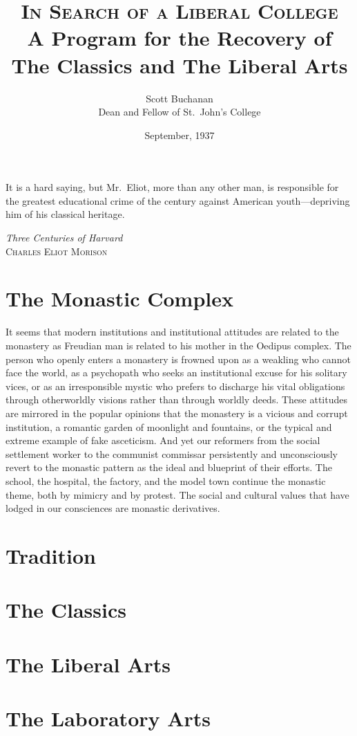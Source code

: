 \documentclass{memoir}
\title{\textsc{In Search of a Liberal College}\\ A Program for the Recovery of The Classics and The Liberal Arts}
\author{Scott Buchanan\\ Dean and Fellow of St.\ John's College}
\date{September, 1937}
\begin{document}
\maketitle

\epigraph{It is a hard saying, but Mr.\ Eliot, more than any other man,
is responsible for the greatest educational crime of the century against
American youth---depriving him of his classical heritage.}{\emph{Three
Centuries of Harvard}\\ \textsc{Charles Eliot Morison}}

\tableofcontents*

\chapter{The Monastic Complex}

It seems that modern institutions and institutional attitudes are
related to the monastery as Freudian man is related to his mother
in the Oedipus complex. The person who openly enters a monastery is
frowned upon as a weakling who cannot face the world, as a psychopath
who seeks an institutional excuse for his solitary vices, or as an
irresponsible mystic who prefers to discharge his vital obligations
through otherworldly visions rather than through worldly deeds. These
attitudes are mirrored in the popular opinions that the monastery is
a vicious and corrupt institution, a romantic garden of moonlight and
fountains, or the typical and extreme example of fake asceticism. And
yet our reformers from the social settlement worker to the communist
commissar persistently and unconsciously revert to the monastic pattern
as the ideal and blueprint of their efforts. The school, the hospital,
the factory, and the model town continue the monastic theme, both by
mimicry and by protest. The social and cultural values that have lodged
in our consciences are monastic derivatives.

\chapter{Tradition}
\chapter{The Classics}
\chapter{The Liberal Arts}
\chapter{The Laboratory Arts}
\end{document}
